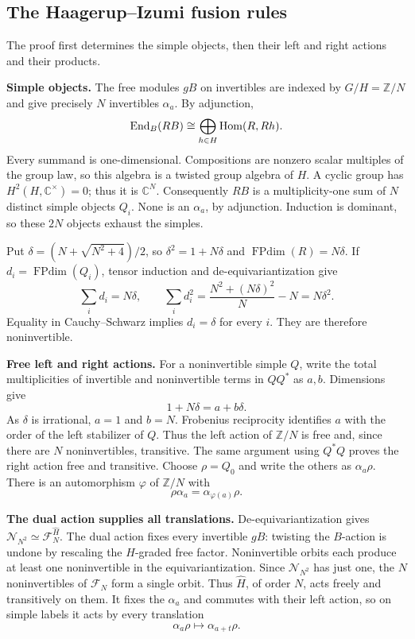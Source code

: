 \documentclass[11pt]{article}
\newcommand{\C}{\mathbb C}\newcommand{\Q}{\mathbb Q}\newcommand{\Z}{\mathbb Z}
\newcommand{\Ncat}{\mathcal N}\newcommand{\Pcat}{\mathcal P}\newcommand{\Fcat}{\mathcal F}
\newcommand{\FP}{\operatorname{FPdim}}\newcommand{\Irr}{\operatorname{Irr}}
\newcommand{\Hom}{\operatorname{Hom}}\newcommand{\id}{\operatorname{id}}
\numberwithin{equation}{section}
\begin{document}
\subsection{The Haagerup--Izumi fusion rules}\label{A:cat:HIfusion}
The proof first determines the simple objects, then their left and right actions and their products.

\textbf{Simple objects.} The free modules $gB$ on invertibles are indexed by $G/H=\Z/N$ and give precisely $N$ invertibles $\alpha_a$. By adjunction,
\[
 \End_B(RB)\cong\bigoplus_{h\in H}\Hom(R,Rh).
\]
Every summand is one-dimensional. Compositions are nonzero scalar multiples of the group law, so this algebra is a twisted group algebra of $H$. A cyclic group has $H^2(H,\C^\times)=0$; thus it is $\C^N$. Consequently $RB$ is a multiplicity-one sum of $N$ distinct simple objects $Q_i$. None is an $\alpha_a$, by adjunction. Induction is dominant, so these $2N$ objects exhaust the simples.

Put $\delta=(N+\sqrt{N^2+4})/2$, so $\delta^2=1+N\delta$ and $\FP(R)=N\delta$. If $d_i=\FP(Q_i)$, tensor induction and de-equivariantization give
\[
 \sum_i d_i=N\delta,\qquad
 \sum_i d_i^2=\frac{N^2+(N\delta)^2}{N}-N=N\delta^2.
\]
Equality in Cauchy--Schwarz implies $d_i=\delta$ for every $i$. They are therefore noninvertible.

\textbf{Free left and right actions.} For a noninvertible simple $Q$, write the total multiplicities of invertible and noninvertible terms in $QQ^*$ as $a,b$. Dimensions give
\[
 1+N\delta=a+b\delta.
\]
As $\delta$ is irrational, $a=1$ and $b=N$. Frobenius reciprocity identifies $a$ with the order of the left stabilizer of $Q$. Thus the left action of $\Z/N$ is free and, since there are $N$ noninvertibles, transitive. The same argument using $Q^*Q$ proves the right action free and transitive. Choose $\rho=Q_0$ and write the others as $\alpha_a\rho$. There is an automorphism $\varphi$ of $\Z/N$ with
\[
 \rho\alpha_a=\alpha_{\varphi(a)}\rho.
\]

\textbf{The dual action supplies all translations.} De-equivariantization gives $\Ncat_{N^2}\simeq\Fcat_N^{\widehat H}$. The dual action fixes every invertible $gB$: twisting the $B$-action is undone by rescaling the $H$-graded free factor. Noninvertible orbits each produce at least one noninvertible in the equivariantization. Since $\Ncat_{N^2}$ has just one, the $N$ noninvertibles of $\Fcat_N$ form a single orbit. Thus $\widehat H$, of order $N$, acts freely and transitively on them. It fixes the $\alpha_a$ and commutes with their left action, so on simple labels it acts by every translation
\[
 \alpha_a\rho\longmapsto\alpha_{a+t}\rho.
\]
\end{document}
